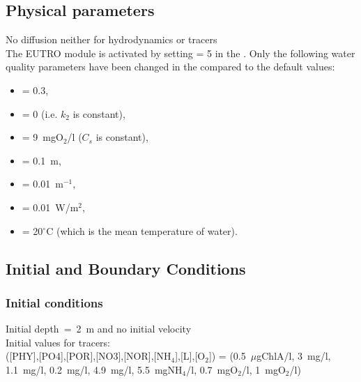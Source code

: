 \subsection{Physical parameters}
%
No diffusion neither for hydrodynamics or tracers\\
%
The EUTRO module is activated by setting  = 5
in the  .
%
Only the following water quality parameters have been changed
in the \waqtel {} compared to the default values:
\begin{itemize}
\item {} = 0.3,
\item {} = 0 (i.e. $k_2$ is constant),
\item {} = 9~mgO$_2$/l ($C_s$ is constant),
\item {} = 0.1~m,
\item {} = 0.01~m$^{-1}$,
\item {} = 0.01~W/m$^2$,
\item {} = 20$^\circ$C (which is the mean temperature of water).
\end{itemize}
%
%
%
%
%
%
\subsection{Initial and Boundary Conditions}
%
\subsubsection{Initial conditions}
%
Initial depth~=~2~m
and no initial velocity\\
Initial values for tracers:\\
([PHY],[PO4],[POR],[NO3],[NOR],[NH$_4$],[L],[O$_2$]) =
(0.5~$\mu$gChlA/l, 3~mg/l, 1.1~mg/l, 0.2~mg/l, 4.9~mg/l, 5.5~mgNH$_4$/l, 0.7~mgO$_2$/l, 1~mgO$_2$/l)
%
